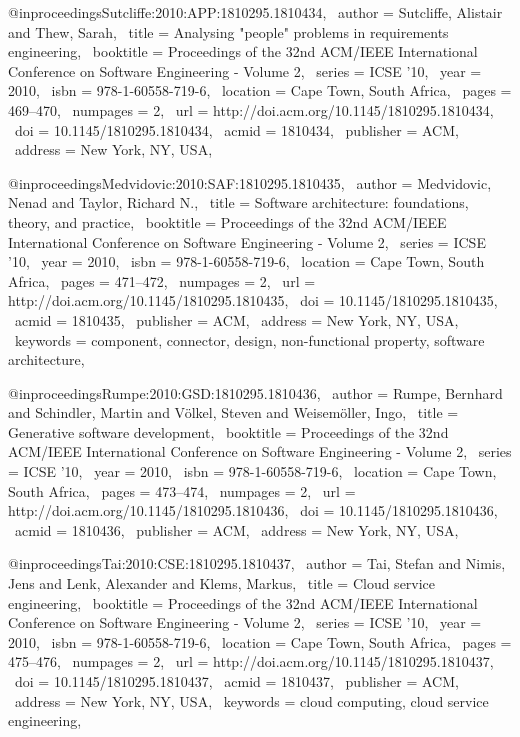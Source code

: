 @inproceedings{Sutcliffe:2010:APP:1810295.1810434,
 author = {Sutcliffe, Alistair and Thew, Sarah},
 title = {Analysing "people" problems in requirements engineering},
 booktitle = {Proceedings of the 32nd ACM/IEEE International Conference on Software Engineering - Volume 2},
 series = {ICSE '10},
 year = {2010},
 isbn = {978-1-60558-719-6},
 location = {Cape Town, South Africa},
 pages = {469--470},
 numpages = {2},
 url = {http://doi.acm.org/10.1145/1810295.1810434},
 doi = {10.1145/1810295.1810434},
 acmid = {1810434},
 publisher = {ACM},
 address = {New York, NY, USA},
} 

@inproceedings{Medvidovic:2010:SAF:1810295.1810435,
 author = {Medvidovic, Nenad and Taylor, Richard N.},
 title = {Software architecture: foundations, theory, and practice},
 booktitle = {Proceedings of the 32nd ACM/IEEE International Conference on Software Engineering - Volume 2},
 series = {ICSE '10},
 year = {2010},
 isbn = {978-1-60558-719-6},
 location = {Cape Town, South Africa},
 pages = {471--472},
 numpages = {2},
 url = {http://doi.acm.org/10.1145/1810295.1810435},
 doi = {10.1145/1810295.1810435},
 acmid = {1810435},
 publisher = {ACM},
 address = {New York, NY, USA},
 keywords = {component, connector, design, non-functional property, software architecture},
} 

@inproceedings{Rumpe:2010:GSD:1810295.1810436,
 author = {Rumpe, Bernhard and Schindler, Martin and V\"{o}lkel, Steven and Weisem\"{o}ller, Ingo},
 title = {Generative software development},
 booktitle = {Proceedings of the 32nd ACM/IEEE International Conference on Software Engineering - Volume 2},
 series = {ICSE '10},
 year = {2010},
 isbn = {978-1-60558-719-6},
 location = {Cape Town, South Africa},
 pages = {473--474},
 numpages = {2},
 url = {http://doi.acm.org/10.1145/1810295.1810436},
 doi = {10.1145/1810295.1810436},
 acmid = {1810436},
 publisher = {ACM},
 address = {New York, NY, USA},
} 

@inproceedings{Tai:2010:CSE:1810295.1810437,
 author = {Tai, Stefan and Nimis, Jens and Lenk, Alexander and Klems, Markus},
 title = {Cloud service engineering},
 booktitle = {Proceedings of the 32nd ACM/IEEE International Conference on Software Engineering - Volume 2},
 series = {ICSE '10},
 year = {2010},
 isbn = {978-1-60558-719-6},
 location = {Cape Town, South Africa},
 pages = {475--476},
 numpages = {2},
 url = {http://doi.acm.org/10.1145/1810295.1810437},
 doi = {10.1145/1810295.1810437},
 acmid = {1810437},
 publisher = {ACM},
 address = {New York, NY, USA},
 keywords = {cloud computing, cloud service engineering},
} 

